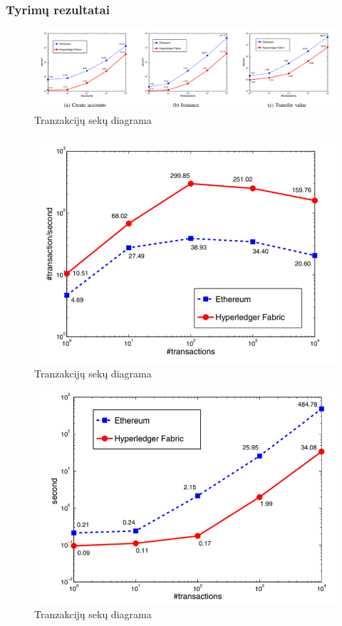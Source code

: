\documentclass{VUMIFPSkursinis}
\begin{document}
		\subsubsection{Tyrimų rezultatai}
\begin{figure}[H]
    \centering
    \includegraphics[scale=0.5]{img/TwoGreitis}
    \caption{Tranzakcijų sekų diagrama}   %
    \label{img:mlp}
\end{figure}				
\begin{figure}[H]
    \centering
    \includegraphics[scale=0.5]{img/TwoPraeinamumas}
    \caption{Tranzakcijų sekų diagrama}   %
    \label{img:mlp}
\end{figure}
\begin{figure}[H]
    \centering
    \includegraphics[scale=0.5]{img/TwoVelavimas}
    \caption{Tranzakcijų sekų diagrama}   %
    \label{img:mlp}
\end{figure}
\end{document}
